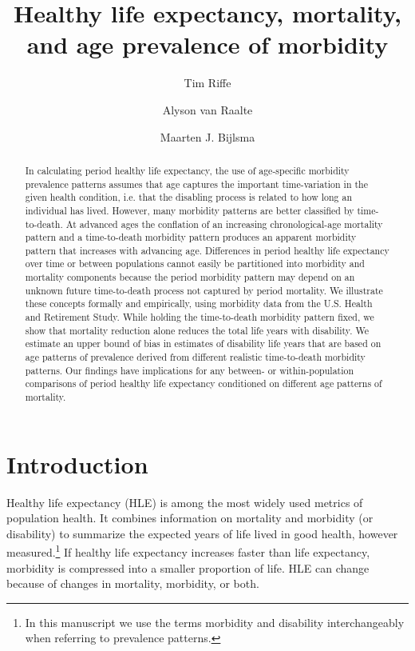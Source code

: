 \documentclass[12pt,oneside,a4paper]{article} %
\begin{document}
\title{Healthy life expectancy, mortality, and age prevalence of morbidity}

\author[1]{Tim Riffe}
\author[1]{Alyson van Raalte}
\author[1]{Maarten J. Bijlsma}


\maketitle

\begin{abstract}
In calculating period healthy life expectancy, the use of age-specific
morbidity prevalence patterns assumes that age captures the important
time-variation in the given health condition, i.e. that the disabling process is related to how long an individual has lived. However, many morbidity patterns are better classified by time-to-death. At advanced ages the conflation of an increasing chronological-age mortality pattern and a time-to-death morbidity pattern produces an apparent morbidity pattern that increases with advancing age. Differences in period healthy life expectancy over time or between populations cannot easily be partitioned into morbidity and mortality components because the period morbidity pattern may depend on an unknown future time-to-death process not captured by period mortality. We illustrate these concepts formally and empirically, using morbidity data from the U.S. Health and Retirement Study.
While holding the time-to-death morbidity pattern fixed, we show that mortality
reduction alone reduces the total life years with disability. We estimate an
upper bound of bias in estimates of disability life years that are based on age
patterns of prevalence derived from different realistic time-to-death morbidity
patterns.
Our findings have implications for any between- or within-population
comparisons of period healthy life expectancy conditioned on different age patterns of mortality.
\end{abstract}

\section{Introduction}

Healthy life expectancy (HLE) is among the most widely used metrics of
population health. It combines information on mortality and morbidity (or disability) to
summarize the expected years of life lived in good health, however measured.\footnote{In this manuscript we use the terms morbidity and disability interchangeably when referring to prevalence patterns.} If
healthy life expectancy increases faster than life expectancy, morbidity is
compressed into a smaller proportion of life. HLE can change because of changes in mortality, morbidity, or both.
\end{document}
